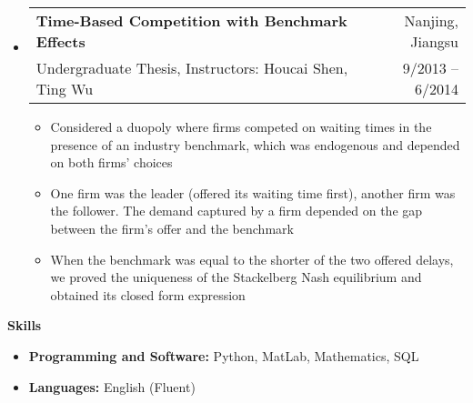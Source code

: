 \documentclass[letterpaper,10pt]{article}
\makeatletter
\newcommand{\resitem}[1]{\item #1 \vspace{-2pt}}
\newcommand{\resheading}[1]{{\large \colorbox{mygrey}{\begin{minipage}{\textwidth}{\textbf{#1 \vphantom{p\^{E}}}}\end{minipage}}}}
\newcommand{\ressubheading}[4]{
\begin{tabular*}{6.5in}{l@{\extracolsep{\fill}}r}
    \textbf{#1} & #2 \\
    #3 & #4 \\
\end{tabular*}\vspace{-6pt}}
\makeatother
\begin{document}
\begin{itemize}
\item
\ressubheading{Time-Based Competition with Benchmark Effects}{Nanjing, Jiangsu}{Undergraduate Thesis, Instructors: Houcai Shen, Ting Wu}{9/2013 -- 6/2014}
\begin{itemize}
\resitem{Considered a duopoly where firms competed on waiting times in the presence of an industry benchmark, which was endogenous and depended on both firms' choices}
\resitem{One firm was the leader (offered its waiting time first), another firm was the follower. The demand captured by a firm depended on the gap between the firm's offer and the benchmark}
\resitem{When the benchmark was equal to the shorter of the two offered delays, we proved the uniqueness of the Stackelberg Nash equilibrium and obtained its closed form expression}
\end{itemize}



\end{itemize}


\newpage
\resheading{Skills}
\begin{itemize}
\item \textbf{Programming and Software:} Python, MatLab, Mathematics, SQL
\item \textbf{Languages:} English (Fluent)
\end{itemize}
\end{document}
